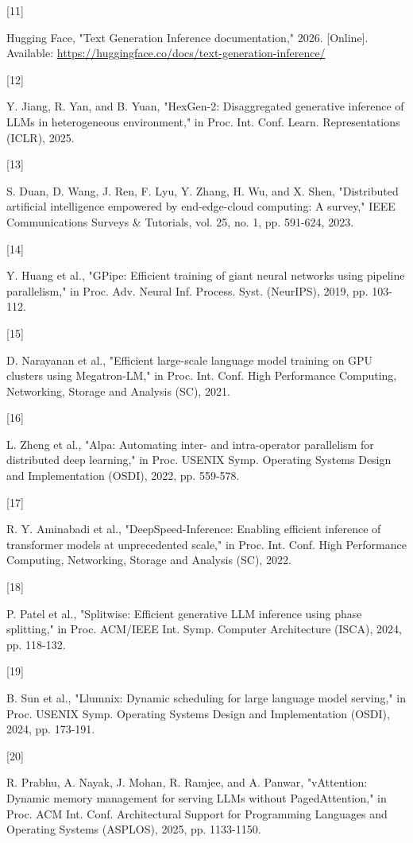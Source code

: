 \hypertarget{ref:11}{[11]} Hugging Face, "Text Generation Inference documentation," 2026. [Online]. Available: \href{https://huggingface.co/docs/text-generation-inference/}{\url{https://huggingface.co/docs/text-generation-inference/}}


\hypertarget{ref:12}{[12]} Y. Jiang, R. Yan, and B. Yuan, "HexGen-2: Disaggregated generative inference of LLMs in heterogeneous environment," in Proc. Int. Conf. Learn. Representations (ICLR), 2025.


\hypertarget{ref:13}{[13]} S. Duan, D. Wang, J. Ren, F. Lyu, Y. Zhang, H. Wu, and X. Shen, "Distributed artificial intelligence empowered by end-edge-cloud computing: A survey," IEEE Communications Surveys \& Tutorials, vol. 25, no. 1, pp. 591-624, 2023.


\hypertarget{ref:14}{[14]} Y. Huang et al., "GPipe: Efficient training of giant neural networks using pipeline parallelism," in Proc. Adv. Neural Inf. Process. Syst. (NeurIPS), 2019, pp. 103-112.


\hypertarget{ref:15}{[15]} D. Narayanan et al., "Efficient large-scale language model training on GPU clusters using Megatron-LM," in Proc. Int. Conf. High Performance Computing, Networking, Storage and Analysis (SC), 2021.


\hypertarget{ref:16}{[16]} L. Zheng et al., "Alpa: Automating inter- and intra-operator parallelism for distributed deep learning," in Proc. USENIX Symp. Operating Systems Design and Implementation (OSDI), 2022, pp. 559-578.


\hypertarget{ref:17}{[17]} R. Y. Aminabadi et al., "DeepSpeed-Inference: Enabling efficient inference of transformer models at unprecedented scale," in Proc. Int. Conf. High Performance Computing, Networking, Storage and Analysis (SC), 2022.


\hypertarget{ref:18}{[18]} P. Patel et al., "Splitwise: Efficient generative LLM inference using phase splitting," in Proc. ACM/IEEE Int. Symp. Computer Architecture (ISCA), 2024, pp. 118-132.


\hypertarget{ref:19}{[19]} B. Sun et al., "Llumnix: Dynamic scheduling for large language model serving," in Proc. USENIX Symp. Operating Systems Design and Implementation (OSDI), 2024, pp. 173-191.


\hypertarget{ref:20}{[20]} R. Prabhu, A. Nayak, J. Mohan, R. Ramjee, and A. Panwar, "vAttention: Dynamic memory management for serving LLMs without PagedAttention," in Proc. ACM Int. Conf. Architectural Support for Programming Languages and Operating Systems (ASPLOS), 2025, pp. 1133-1150.


